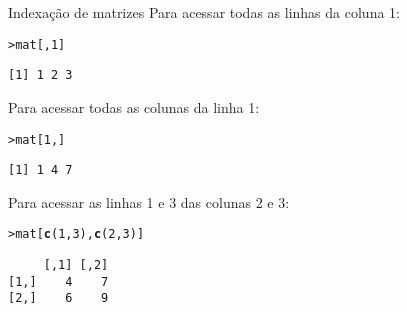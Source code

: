 \documentclass[10pt,handout]{beamer}\usepackage{graphicx, color}
\makeatletter
\newcommand{\hlfunctioncall}[1]{\textcolor[rgb]{0,0,0.545098039215686}{\textbf{#1}}}%
\newenvironment{kframe}{%
 \def\at@end@of@kframe{}%
 \ifinner\ifhmode%
  \def\at@end@of@kframe{\end{minipage}}%
  \begin{minipage}{\columnwidth}%
 \fi\fi%
 \def\FrameCommand##1{\hskip\@totalleftmargin \hskip-\fboxsep
 \colorbox{shadecolor}{##1}\hskip-\fboxsep
     \hskip-\linewidth \hskip-\@totalleftmargin \hskip\columnwidth}%
 \MakeFramed {\advance\hsize-\width
   \@totalleftmargin\z@ \linewidth\hsize
   \@setminipage}}%
 {\par\unskip\endMakeFramed%
 \at@end@of@kframe}
\newenvironment{knitrout}{}{} %
\makeatother
\begin{document}
\begin{frame}[fragile=singleslide]{Indexação de matrizes}
Para acessar todas as linhas da coluna 1:
\begin{knitrout}\small
{}\color{fgcolor}\begin{kframe}
\begin{alltt}
> mat[,1]
\end{alltt}
\begin{verbatim}
[1] 1 2 3
\end{verbatim}
\end{kframe}
\end{knitrout}

Para acessar todas as colunas da linha 1:
\begin{knitrout}\small
{}\color{fgcolor}\begin{kframe}
\begin{alltt}
> mat[1,]
\end{alltt}
\begin{verbatim}
[1] 1 4 7
\end{verbatim}
\end{kframe}
\end{knitrout}

Para acessar as linhas 1 e 3 das colunas 2 e 3:
\begin{knitrout}\small
{}\color{fgcolor}\begin{kframe}
\begin{alltt}
> mat[\hlfunctioncall{c}(1,3), \hlfunctioncall{c}(2,3)]
\end{alltt}
\begin{verbatim}
     [,1] [,2]
[1,]    4    7
[2,]    6    9
\end{verbatim}
\end{kframe}
\end{knitrout}

\end{frame}
\end{document}
